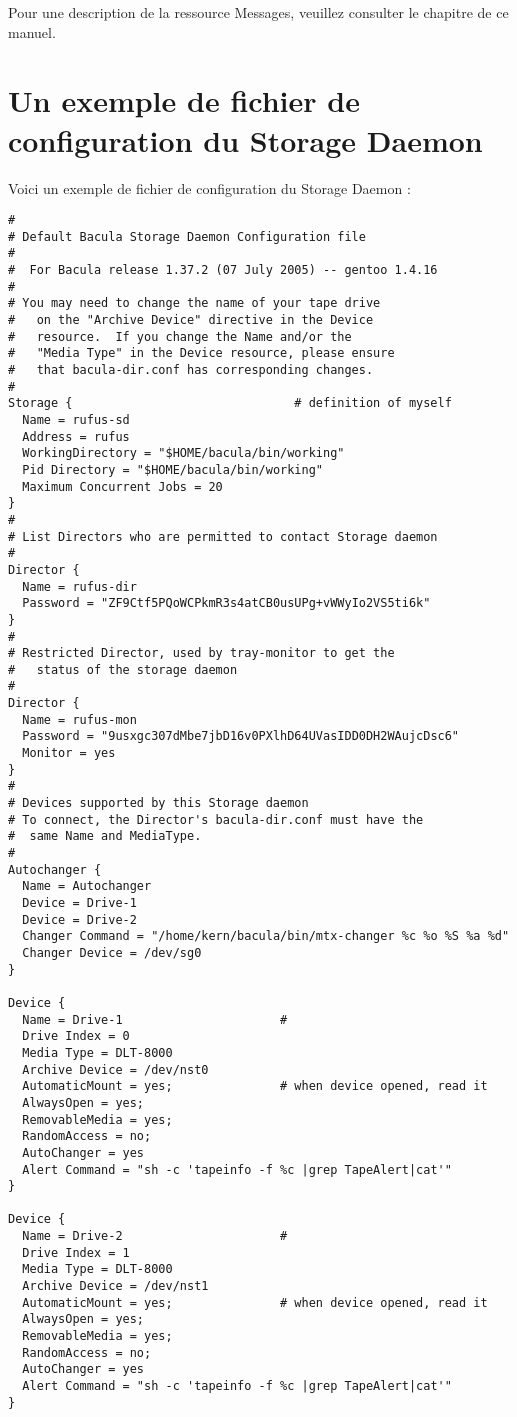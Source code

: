 Pour une description de la ressource Messages, veuillez consulter 
le chapitre  de ce 
manuel.

\section{Un exemple de fichier de configuration du Storage Daemon}
\label{SampleConfiguration}

Voici un exemple de fichier de configuration du Storage Daemon :

\footnotesize
\begin{verbatim}
#
# Default Bacula Storage Daemon Configuration file
#
#  For Bacula release 1.37.2 (07 July 2005) -- gentoo 1.4.16
#
# You may need to change the name of your tape drive
#   on the "Archive Device" directive in the Device
#   resource.  If you change the Name and/or the
#   "Media Type" in the Device resource, please ensure
#   that bacula-dir.conf has corresponding changes.
#
Storage {                               # definition of myself
  Name = rufus-sd
  Address = rufus
  WorkingDirectory = "$HOME/bacula/bin/working"
  Pid Directory = "$HOME/bacula/bin/working"
  Maximum Concurrent Jobs = 20
}
#
# List Directors who are permitted to contact Storage daemon
#
Director {
  Name = rufus-dir
  Password = "ZF9Ctf5PQoWCPkmR3s4atCB0usUPg+vWWyIo2VS5ti6k"
}
#
# Restricted Director, used by tray-monitor to get the
#   status of the storage daemon
#
Director {
  Name = rufus-mon
  Password = "9usxgc307dMbe7jbD16v0PXlhD64UVasIDD0DH2WAujcDsc6"
  Monitor = yes
}
#
# Devices supported by this Storage daemon
# To connect, the Director's bacula-dir.conf must have the
#  same Name and MediaType.
#
Autochanger {
  Name = Autochanger
  Device = Drive-1
  Device = Drive-2
  Changer Command = "/home/kern/bacula/bin/mtx-changer %c %o %S %a %d"
  Changer Device = /dev/sg0
}

Device {
  Name = Drive-1                      #
  Drive Index = 0 
  Media Type = DLT-8000
  Archive Device = /dev/nst0
  AutomaticMount = yes;               # when device opened, read it
  AlwaysOpen = yes;
  RemovableMedia = yes;
  RandomAccess = no;
  AutoChanger = yes
  Alert Command = "sh -c 'tapeinfo -f %c |grep TapeAlert|cat'"
}

Device {
  Name = Drive-2                      #
  Drive Index = 1
  Media Type = DLT-8000
  Archive Device = /dev/nst1
  AutomaticMount = yes;               # when device opened, read it
  AlwaysOpen = yes;
  RemovableMedia = yes;
  RandomAccess = no;
  AutoChanger = yes
  Alert Command = "sh -c 'tapeinfo -f %c |grep TapeAlert|cat'"
}


\end{verbatim}
